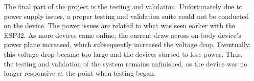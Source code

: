 The final part of the project is the testing and validation.
Unfortunately due to power supply issues, a proper testing and validation suite could not be conducted on the device.
The power issues are related to what was seen earlier with the ESP32.
As more devices came online, the current draw across on-body device's power plane increased, which subsequently increased the voltage drop.
Eventually, this voltage drop became too large and the devices started to lose power.
Thus, the testing and validation of the system remains unfinished, as the device was no longer responsive at the point when testing began.
